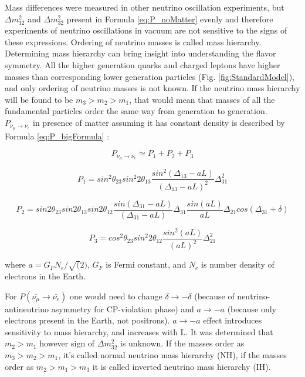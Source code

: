 Mass differences were measured in other neutrino oscillation experiments, but ${\Delta}m_{12}^2$ and ${\Delta}m_{32}^2$ present in Formula \ref{eq:P_noMatter} evenly and therefore experiments of neutrino oscillations in vacuum are not sensitive to the signs of these expressions. Ordering of neutrino masses is called mass hierarchy. Determining mass hierarchy can bring insight into understanding the flavor symmetry. All the higher generation quarks and charged leptons have higher masses than corresponding lower generation particles (Fig. \ref{fig:StandardModel}), and only ordering of neutrino masses is not known. If the neutrino mass hierarchy will be found to be $m_3>m_2>m_1$, that would mean that masses of all the fundamental particles order the same way from generation to generation. \\

$P_{\nu_\mu \rightarrow \nu_e}$ in presence of matter assuming it has constant density is described by Formula \ref{eq:P_bigFormula} \cite{ref_theory_Osc}: \\
\begin{center}

\begin{equation}
\label{eq:P_bigFormula}
P_{\nu_\mu \rightarrow \nu_e} \simeq P_1 + P_2 + P_3 
\end{equation}

\begin{equation}
\label{eq:P_bigFormula_1}
P_1 = sin^2{\theta_{23}}sin^2{2\theta_{13}}\frac{sin^2(\Delta_{13}-aL)}{(\Delta_{13}-aL)^2}\Delta^2_{31}
\end{equation}

\begin{equation}
\label{eq:P_bigFormula_2}
P_2 = sin2\theta_{23}sin2\theta_{13}sin2\theta_{12}\frac{sin(\Delta_{31}-aL)}{(\Delta_{31}-aL)}\Delta_{31}\frac{sin(aL)}{aL}\Delta_{21}cos(\Delta_{31}+\delta)
\end{equation}

\begin{equation}
\label{eq:P_bigFormula_3}
P_3 = cos^2\theta_{23}sin^2{2\theta_{12}}\frac{sin^2(aL)}{(aL)^2}\Delta^2_{21}
\end{equation}

where $a={G_F}{N_e}/\sqrt(2)$, $G_F$ is Fermi constant, and $N_e$ is number density of electrons in the Earth.\\
\end{center}

For $P(\bar{\nu_\mu} \rightarrow \bar{\nu_e})$ one would need to change $\delta \rightarrow -\delta$ (because of neutrino-antineutrino asymmetry for CP-violation phase) and $a \rightarrow -a$ (because only electrons present in the Earth, not positrons). $a \rightarrow -a$ effect introduces sensitivity to mass hierarchy, and increases with L. It was determined that $m_2>m_1$ however sign of ${\Delta}m_{32}^2$ is unknown. If the masses order as $m_3 > m_2 > m_1$, it's called normal neutrino mass hierarchy (NH), if the masses order as $m_2 > m_1 > m_3$ it is called inverted neutrino mass hierarchy (IH).\\

